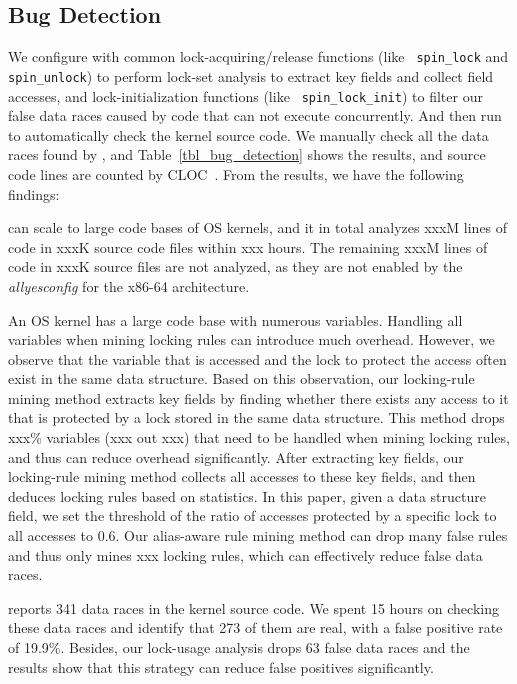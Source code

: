 \subsection{Bug Detection}
\label{subsec_bug_detection}

We configure \sys with common lock-acquiring/release functions (like {\tt 
spin\_lock} and {\tt spin\_unlock}) to perform lock-set analysis to extract key 
fields and collect field accesses, and lock-initialization functions (like {\tt 
spin\_lock\_init}) to filter our false data races caused by code that can not 
execute concurrently. And then run \sys to automatically check the kernel 
source code. We manually check all the data races found by \sys, and 
Table~\ref{tbl_bug_detection} shows the results, and source code lines are 
counted by CLOC~\cite{cloc}. From the results, we have the following findings:

 \sys can scale to large code bases of OS kernels, and it in 
total analyzes xxxM lines of code in xxxK source code files within xxx hours. 
The remaining xxxM lines of code in xxxK source files are not analyzed, as they 
are not enabled by the {\em allyesconfig} for the x86-64 architecture.

 An OS kernel has a large code base with numerous 
variables. Handling all variables when mining locking rules can introduce much 
overhead. However, we observe that the variable that is accessed and the lock 
to protect the access often exist in the same data structure. Based on this 
observation, our locking-rule mining method extracts key fields by finding 
whether there exists any access to it that is protected by a lock stored in the 
same data structure. This method drops xxx\% variables (xxx out xxx) that need 
to be handled when mining locking rules, and thus can reduce overhead 
significantly. After extracting key fields, our locking-rule mining method 
collects all accesses to these key fields, and then deduces locking rules based 
on statistics. In this paper, given a data structure field, we set the 
threshold of the ratio of accesses protected by a specific lock to all accesses 
to 0.6. Our alias-aware rule mining method can drop many false rules and thus 
only mines xxx locking rules, which can effectively reduce false data races.

 \sys reports 341 data races in the kernel source 
code. We spent 15 hours on checking these data races and identify that 273 of 
them are real, with a false positive rate of 19.9\%. Besides, our lock-usage 
analysis drops 63 false data races and the results show that this strategy can 
reduce false positives significantly.


